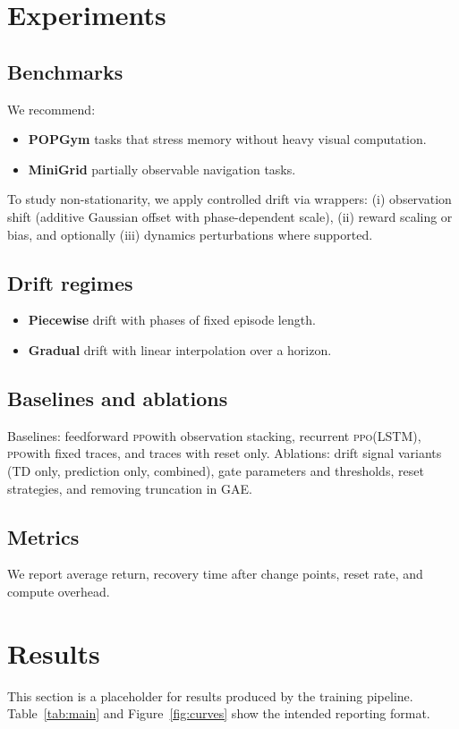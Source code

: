 \documentclass{article}
\newcommand{\PPO}{\textsc{ppo}}
\begin{document}
\section{Experiments}

\subsection{Benchmarks}
We recommend:
\begin{itemize}
  \item \textbf{POPGym} tasks that stress memory without heavy visual computation.
  \item \textbf{MiniGrid} partially observable navigation tasks.
\end{itemize}
To study non-stationarity, we apply controlled drift via wrappers: (i) observation shift (additive Gaussian offset with phase-dependent scale), (ii) reward scaling or bias, and optionally (iii) dynamics perturbations where supported.

\subsection{Drift regimes}
\begin{itemize}
  \item \textbf{Piecewise} drift with phases of fixed episode length.
  \item \textbf{Gradual} drift with linear interpolation over a horizon.
\end{itemize}

\subsection{Baselines and ablations}
Baselines: feedforward \PPO with observation stacking, recurrent \PPO (LSTM), \PPO with fixed traces, and traces with reset only. Ablations: drift signal variants (TD only, prediction only, combined), gate parameters and thresholds, reset strategies, and removing truncation in GAE.

\subsection{Metrics}
We report average return, recovery time after change points, reset rate, and compute overhead.

\section{Results}
This section is a placeholder for results produced by the training pipeline. Table~\ref{tab:main} and Figure~\ref{fig:curves} show the intended reporting format.
\end{document}
